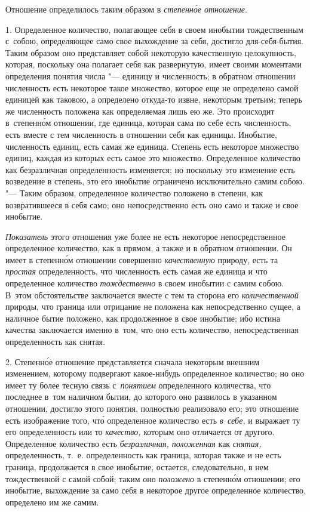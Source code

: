Отношение определилось таким образом в {\em степенн\'{о}е отношение}.


1. Определенное количество, полагающее себя в своем инобытии тождественным
с~собою, определяющее само свое выхождение за себя, достигло для-себя-бытия.
Таким образом оно представляет собой некоторую качественную целокупность,
которая, поскольку она полагает себя как развернутую, имеет своими моментами
определения понятия числа "--- единицу и численность; в обратном отношении
численность есть некоторое такое множество, которое еще не определено самой
единицей как таковою, а определено откуда-то извне, некоторым третьим; теперь
же численность положена как определяемая лишь ею же. Это происходит
в~степенн\'{о}м отношении, где единица, которая сама по себе есть численность,
есть вместе с тем численность в отношении себя как единицы. Инобытие,
численность единиц, есть самая же единица. Степень есть некоторое множество
единиц, каждая из которых есть самое это множество. Определенное количество как
безразличная определенность изменяется; но поскольку это изменение есть
возведение в степень, это его инобытие ограничено исключительно самим собою.
"--- Таким образом, определенное количество положено в степени, как
возвратившееся в себя само; оно непосредственно есть оно само и также
и свое инобытие.

{\em Показатель} этого отношения уже более не есть некоторое непосредственное
определенное количество, как в прямом, а также и в обратном отношении. Он имеет
в степенн\'{о}м отношении совершенно {\em качественную} природу, есть та
{\em простая} определенность, что численность есть самая же единица и что
определенное количество {\em тождественно} в своем инобытии с самим собою.
В~этом обстоятельстве заключается вместе с тем та сторона его
{\em количественной} природы, что граница или отрицание не положена как
непосредственно сущее, а наличное бытие положено, как продолженное в свое
инобытие; ибо истина качества заключается именно в~том, что оно есть
количество, непосредственная определенность как снятая.

2. Степенн\'{о}е отношение представляется сначала некоторым внешним изменением,
которому подвергают какое-нибудь определенное количество; но оно имеет ту более
тесную связь с~{\em понятием} определенного количества, что последнее в~том
наличном бытии, до которого оно развилось в указанном отношении, достигло этого
понятия, полностью реализовало его; это отношение есть изображение того,
чт\'{о} определенное количество есть {\em в~себе,} и выражает ту его
определенность или то {\em качество,} которым оно отличается от другого.
Определенное количество есть {\em безразличная, положенная} как {\em снятая,}
определенность, т.~е. определенность как граница, которая также и не есть
граница, продолжается в свое инобытие, остается, следовательно, в нем
тождественной с самой собой; таким оно {\em положено} в степенн\'{о}м
отношении; его инобытие, выхождение за само себя в некоторое другое
определенное количество, определено им же самим.


